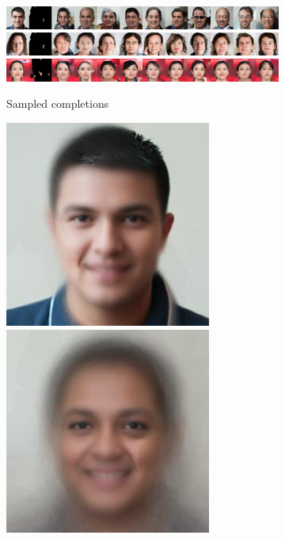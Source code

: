 \begin{figure}[t]
\begin{subfigure}[t]{0.73\textwidth}
    \includegraphics[trim=512px 0px 0px 0px, clip, height=\cmgfailureimgheight]{figs/cigcvae/co_mod_gan_failure/aipo_0_4_2.jpg}
    \includegraphics[trim=512px 0px 0px 0px, clip, height=\cmgfailureimgheight]{figs/cigcvae/co_mod_gan_failure/aipo_1_4_2.jpg}
    \includegraphics[trim=512px 0px 0px 0px, clip, height=\cmgfailureimgheight]{figs/cigcvae/co_mod_gan_failure/aipo_56_4_12.jpg}
    \caption{Sampled completions}
  \end{subfigure}
  \begin{subfigure}[t]{0.1\textwidth}
    \centering
    \includegraphics[height=\cmgfailureimgheight]{figs/cigcvae/co_mod_gan_failure/avg_aipo_0_3_2.jpg}
    \includegraphics[height=\cmgfailureimgheight]{figs/cigcvae/co_mod_gan_failure/avg_aipo_0_4_2.jpg}

\end{subfigure}
\end{figure}
